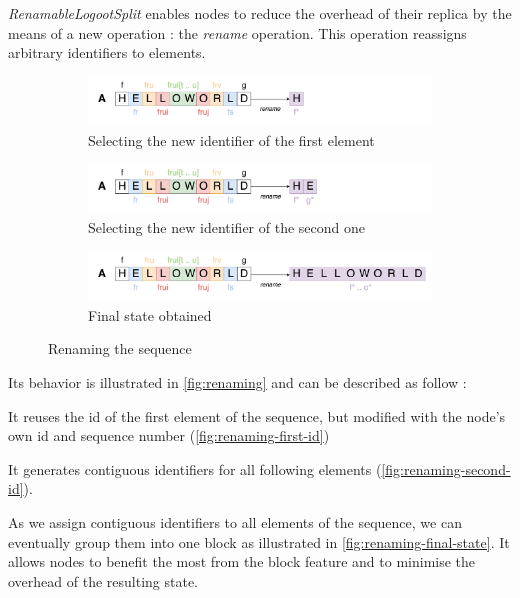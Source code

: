\documentclass[sigplan,10pt]{acmart}
\begin{document}
\emph{RenamableLogootSplit} enables nodes to reduce the overhead of their replica by the means of a new operation : the \emph{rename} operation.
This operation reassigns arbitrary identifiers to elements.

\begin{figure}
    \centering
    \begin{subfigure}{\columnwidth}
        \includegraphics[width=0.9\columnwidth]{img/renaming-first-id.png}
        \caption{Selecting the new identifier of the first element}
        \label{fig:renaming-first-id}
    \end{subfigure}
    \begin{subfigure}{\columnwidth}
        \includegraphics[width=0.9\columnwidth]{img/renaming-second-id.png}
        \caption{Selecting the new identifier of the second one}
        \label{fig:renaming-second-id}
    \end{subfigure}
    \begin{subfigure}{\columnwidth}
        \includegraphics[width=0.9\columnwidth]{img/renaming-final-state.png}
        \caption{Final state obtained}
        \label{fig:renaming-final-state}
    \end{subfigure}
    \caption{Renaming the sequence}
    \label{fig:renaming}
\end{figure}

Its behavior is illustrated in \autoref{fig:renaming} and can be described as follow :
\begin{enumerate*}
    \item It reuses the id of the first element of the sequence, but modified with the node's own id and sequence number (\autoref{fig:renaming-first-id})
    \item It generates contiguous identifiers for all following elements (\autoref{fig:renaming-second-id}).
\end{enumerate*}
As we assign contiguous identifiers to all elements of the sequence, we can eventually group them into one block as illustrated in \autoref{fig:renaming-final-state}.
It allows nodes to benefit the most from the block feature and to minimise the overhead of the resulting state.
\end{document}
